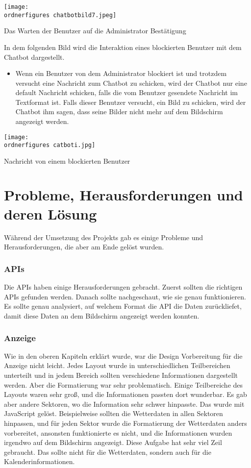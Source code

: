 \captionsetup{type=figure}
\texttt{[image: \\ordnerfigures chatbotbild7.jpeg]}
\caption{Das Warten der Benutzer auf die Administrator Bestätigung}
\label{fig:chat232bo53}
In dem folgenden Bild wird die Interaktion eines blockierten Benutzer mit dem Chatbot dargestellt.
\begin{itemize}
	\item Wenn ein Benutzer von dem Administrator blockiert ist und trotzdem versucht eine Nachricht zum Chatbot zu schicken, wird der Chatbot nur eine default Nachricht schicken, falls die vom Benutzer gesendete Nachricht im Textformat ist. Falls dieser Benutzer versucht, ein Bild zu schicken, wird der Chatbot ihm sagen, dass seine Bilder nicht mehr auf dem Bildschirm angezeigt werden.
\end{itemize}
\captionsetup{type=figure}
\texttt{[image: \\ordnerfigures catboti.jpg]}
\caption{Nachricht von einem blockierten Benutzer}
\label{fig:chatbodfsda53}
\section{Probleme, Herausforderungen und deren Lösung}
Während der Umsetzung des Projekts gab es einige Probleme und Herausforderungen, die aber am Ende gelöst wurden.
\subsubsection{APIs}

Die APIs haben einige Herausforderungen gebracht. Zuerst sollten die richtigen APIs gefunden werden. Danach sollte nachgeschaut, wie sie genau funktionieren. Es sollte genau analysiert, auf welchem Format die API die Daten zurückliefet, damit diese Daten an dem Bildschirm angezeigt werden konnten. 

\subsubsection{Anzeige}

Wie in den oberen Kapiteln erklärt wurde, war die Design Vorbereitung für die Anzeige nicht leicht. Jedes Layout wurde in unterschiedlichen Teilbereichen unterteilt und in jedem Bereich sollten verschiedene Informationen dargestellt werden. Aber die Formatierung war sehr problematisch. Einige Teilbereiche des Layouts waren sehr groß, und die Informationen passten dort wunderbar. Es gab aber andere Sektoren, wo die Information sehr schwer hinpasste. Das wurde mit JavaScript gelöst. Beispielweise sollten die Wetterdaten in allen Sektoren hinpassen, und für jeden Sektor wurde die Formatierung der Wetterdaten anders vorbereitet, ansonsten funktionierte es nicht, und die Informationen wurden irgendwo auf dem Bildschirm angezeigt. Diese Aufgabe hat sehr viel Zeil gebraucht. Das sollte nicht für die Wetterdaten, sondern auch für die Kalenderinformationen. 

